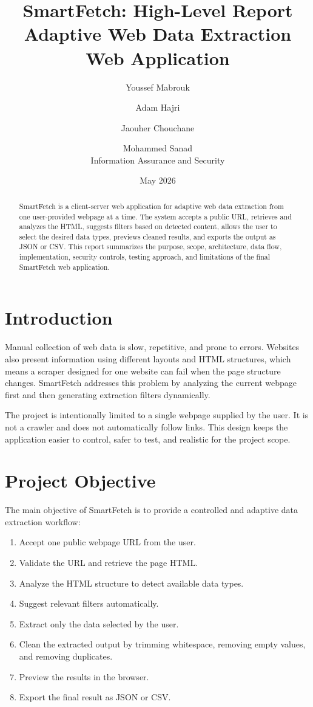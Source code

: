 \documentclass[11pt,a4paper]{article}
\title{\textbf{SmartFetch: High-Level Report}\\
\large Adaptive Web Data Extraction Web Application}
\author{
Youssef Mabrouk \and Adam Hajri \and Jaouher Chouchane \and Mohammed Sanad\\
\small Information Assurance and Security
}
\date{May 2026}
\begin{document}
\maketitle

\begin{abstract}
SmartFetch is a client-server web application for adaptive web data extraction from one user-provided webpage at a time. The system accepts a public URL, retrieves and analyzes the HTML, suggests filters based on detected content, allows the user to select the desired data types, previews cleaned results, and exports the output as JSON or CSV. This report summarizes the purpose, scope, architecture, data flow, implementation, security controls, testing approach, and limitations of the final SmartFetch web application.
\end{abstract}

\tableofcontents
\newpage

\section{Introduction}

Manual collection of web data is slow, repetitive, and prone to errors. Websites also present information using different layouts and HTML structures, which means a scraper designed for one website can fail when the page structure changes. SmartFetch addresses this problem by analyzing the current webpage first and then generating extraction filters dynamically.

The project is intentionally limited to a single webpage supplied by the user. It is not a crawler and does not automatically follow links. This design keeps the application easier to control, safer to test, and realistic for the project scope.

\section{Project Objective}

The main objective of SmartFetch is to provide a controlled and adaptive data extraction workflow:

\begin{enumerate}
  \item Accept one public webpage URL from the user.
  \item Validate the URL and retrieve the page HTML.
  \item Analyze the HTML structure to detect available data types.
  \item Suggest relevant filters automatically.
  \item Extract only the data selected by the user.
  \item Clean the extracted output by trimming whitespace, removing empty values, and removing duplicates.
  \item Preview the results in the browser.
  \item Export the final result as JSON or CSV.
\end{enumerate}
\end{document}
